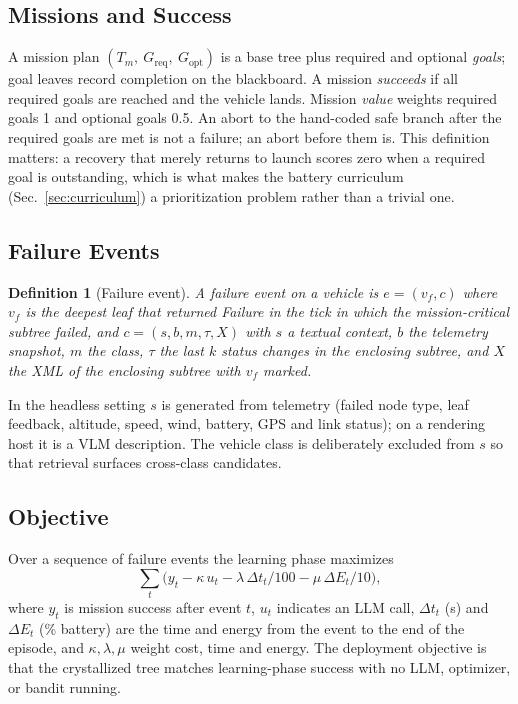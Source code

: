 \documentclass[conference]{IEEEtran}
\newtheorem{definition}{Definition}
\begin{document}
\subsection{Missions and Success}
A mission plan $(T_m,\ G_{\mathrm{req}},\ G_{\mathrm{opt}})$ is a base tree plus required and optional \emph{goals}; goal leaves record completion on the blackboard. A mission \emph{succeeds} if all required goals are reached and the vehicle lands. Mission \emph{value} weights required goals 1 and optional goals 0.5. An abort to the hand-coded safe branch after the required goals are met is not a failure; an abort before them is. This definition matters: a recovery that merely returns to launch scores zero when a required goal is outstanding, which is what makes the battery curriculum (Sec.~\ref{sec:curriculum}) a prioritization problem rather than a trivial one.

\subsection{Failure Events}
\begin{definition}[Failure event]
A failure event on a vehicle is $e=(v_f, c)$ where $v_f$ is the deepest leaf that returned Failure in the tick in which the mission-critical subtree failed, and $c=(s, b, m, \tau, X)$ with $s$ a textual context, $b$ the telemetry snapshot, $m$ the class, $\tau$ the last $k$ status changes in the enclosing subtree, and $X$ the XML of the enclosing subtree with $v_f$ marked.
\end{definition}
In the headless setting $s$ is generated from telemetry (failed node type, leaf feedback, altitude, speed, wind, battery, GPS and link status); on a rendering host it is a VLM description. The vehicle class is deliberately excluded from $s$ so that retrieval surfaces cross-class candidates.

\subsection{Objective}
Over a sequence of failure events the learning phase maximizes
\begin{equation}
\sum_t \big(y_t - \kappa\,u_t - \lambda\,\Delta t_t/100 - \mu\,\Delta E_t/10\big),
\label{eq:objective}
\end{equation}
where $y_t$ is mission success after event $t$, $u_t$ indicates an LLM call, $\Delta t_t$ (s) and $\Delta E_t$ (\% battery) are the time and energy from the event to the end of the episode, and $\kappa,\lambda,\mu$ weight cost, time and energy. The deployment objective is that the crystallized tree matches learning-phase success with no LLM, optimizer, or bandit running.
\end{document}

